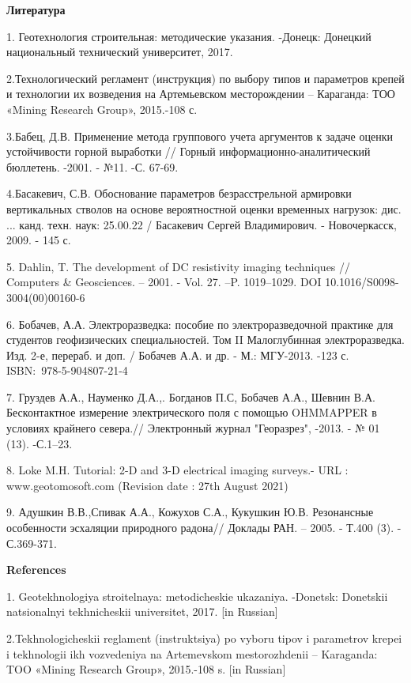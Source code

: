 {\bfseries Литература}

1. Геотехнология строительная: методические указания. -Донецк: Донецкий
национальный технический университет, 2017.

2.Технологический регламент (инструкция) по выбору типов и параметров
крепей и технологии их возведения на Артемьевском месторождении --
Караганда: ТОО «Mining Research Group», 2015.-108 с.

3.Бабец, Д.В. Применение метода группового учета аргументов к задаче
оценки устойчивости горной выработки // Горный
информационно-аналитический бюллетень. -2001. - №11. -С. 67-69.

4.Басакевич, С.В. Обоснование параметров безрасстрельной армировки
вертикальных стволов на основе вероятностной оценки временных нагрузок:
дис. ... канд. техн. наук: 25.00.22 / Басакевич Сергей Владимирович. -
Новочеркасск, 2009. - 145 с.

5. Dahlin, T. The development of DC resistivity imaging techniques //
Computers \& Geosciences. -- 2001. - Vol. 27. --P. 1019--1029. DOI
10.1016/S0098-3004(00)00160-6

6. Бобачев, А.А. Электроразведка: пособие по электроразведочной практике
для студентов геофизических специальностей. Том II Малоглубинная
электроразведка. Изд. 2-е, перераб. и доп. / Бобачев А.А. и др. - М.:
МГУ-2013. -123 с. ISBN:~978-5-904807-21-4

7. Груздев А.А., Науменко Д.А.,. Богданов П.С, Бобачев А.А., Шевнин В.А.
Бесконтактное измерение электрического поля с помощью OHMMAPPER в
условиях крайнего севера.// Электронный журнал "Георазрез", -2013. - №
01 (13). -С.1--23.

8. Loke M.H. Tutorial: 2-D and 3-D electrical imaging surveys.- URL :
www.geotomosoft.com (Revision date : 27th August 2021)

9. Адушкин В.В.,Спивак А.А., Кожухов С.А., Кукушкин Ю.В. Резонансные
особенности эсхаляции природного радона// Доклады РАН. -- 2005. - Т.400
(3). - С.369-371.

{\bfseries References}

1. Geotekhnologiya stroitel\textquotesingle naya: metodicheskie
ukazaniya. -Donetsk: Donetskii natsional\textquotesingle nyi
tekhnicheskii universitet, 2017. {[}in Russian{]}

2.Tekhnologicheskii reglament (instruktsiya) po vyboru tipov i
parametrov krepei i tekhnologii ikh vozvedeniya na
Artem\textquotesingle evskom mestorozhdenii -- Karaganda: TOO «Mining
Research Group», 2015.-108 s. {[}in Russian{]}

